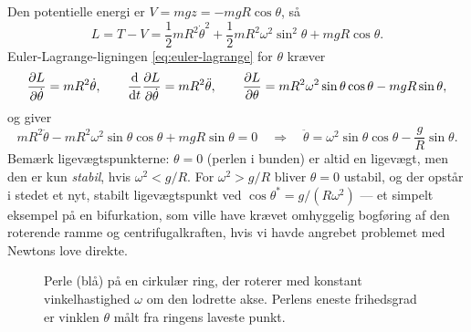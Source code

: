 \begin{eksempel}
Den potentielle energi er $V = mgz = -mgR\cos\theta$, så
\begin{equation}
  L = T - V = \frac12 mR^2\dot\theta^2 + \frac12 mR^2\omega^2\sin^2\theta + mgR\cos\theta.
\end{equation}
Euler-Lagrange-ligningen \eqref{eq:euler-lagrange} for $\theta$ kræver
\begin{equation}
  \pdv{L}{\dot\theta} = mR^2\dot\theta, \qquad
  \dv{t}\pdv{L}{\dot\theta} = mR^2\ddot\theta, \qquad
  \pdv{L}{\theta} = mR^2\omega^2\sin\theta\cos\theta - mgR\sin\theta,
\end{equation}
og giver
\begin{equation}
  mR^2\ddot\theta - mR^2\omega^2\sin\theta\cos\theta + mgR\sin\theta = 0
  \quad\Longrightarrow\quad
  \ddot\theta = \omega^2\sin\theta\cos\theta - \frac{g}{R}\sin\theta.
\end{equation}
Bemærk ligevægtspunkterne: $\theta=0$ (perlen i bunden) er altid en
ligevægt, men den er kun \emph{stabil}, hvis $\omega^2 < g/R$. For
$\omega^2 > g/R$ bliver $\theta=0$ ustabil, og der opstår i stedet et
nyt, stabilt ligevægtspunkt ved $\cos\theta^\ast = g/(R\omega^2)$ — et
simpelt eksempel på en bifurkation, som ville have krævet omhyggelig
bogføring af den roterende ramme og centrifugalkraften, hvis vi havde
angrebet problemet med Newtons love direkte.
\end{eksempel}

\begin{figure}[htbp]
  \centering
  \caption{Perle (blå) på en cirkulær ring, der roterer med konstant
  vinkelhastighed $\omega$ om den lodrette akse. Perlens eneste
  frihedsgrad er vinklen $\theta$ målt fra ringens laveste punkt.}
  \label{fig:roterende-ring}
\end{figure}


